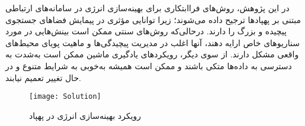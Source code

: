 در این پژوهش، روش‌های فراابتکاری برای بهینه‌سازی انرژی در سامانه‌های ارتباطی مبتنی بر پهپادها ترجیح داده می‌شوند؛ زیرا توانایی مؤثری در پیمایش فضاهای جستجوی پیچیده و بزرگ را دارند. درحالی‌که روش‌های سنتی ممکن است بینش‌هایی در مورد سناریوهای خاص ارایه دهند، آنها اغلب در مدیریت پیچیدگی‌ها و ماهیت پویای محیط‌های واقعی مشکل دارند. از سوی دیگر، رویکردهای یادگیری ماشین ممکن است به‌شدت به دسترسی به داده‌ها متکی باشند و ممکن است همیشه به‌خوبی به شرایط متنوع و در حال تغییر تعمیم نیابند.

\begin{figure}
\texttt{[image: Solution]}
\caption[راه‌کار‌هایی برای بهینه سازی انرژی در پهپاد‌ها]{رویکرد بهینه‌سازی انرژی در پهپاد}
\label{fig:solutions}
\end{figure}
